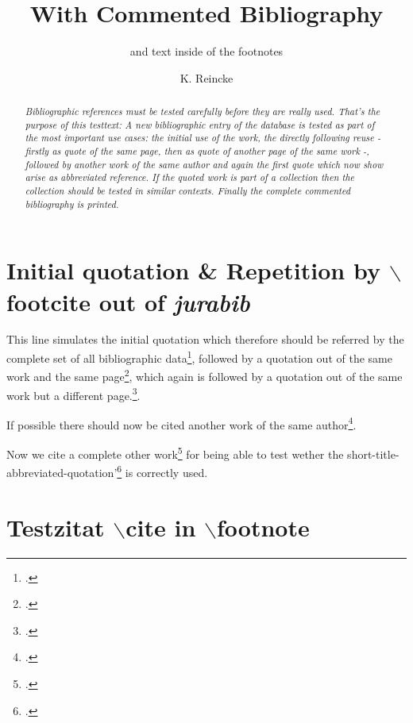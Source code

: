 \documentclass[DIV=calc,BCOR=5mm,11pt,headings=small,oneside,abstract=true, toc=bib]{scrartcl}
\begin{document}
\nocite{*}

\titlehead{bibliography test}
\subject{For testing \itshape{new bibliographisc data}}
\title{With Commented Bibliography}
\subtitle{and text inside of the footnotes}
\author{K. Reincke}
\maketitle

\begin{abstract}
\noindent \itshape
Bibliographic references must be tested carefully before they are really used.
That's the purpose of this testtext: A new bibliographic entry of the database
is tested as part of the most important use cases: the initial use of the work,
the directly following reuse - firstly as quote of the same page, then as quote
of another page of the same work -, followed by another work of the same author
and again the first quote which now show arise as abbreviated reference. If the
quoted work is part of a collection then the collection should be tested in
similar contexts. Finally the complete commented bibliography is printed.
\end{abstract}

\section{Initial quotation \& Repetition by $\backslash$footcite out of
\emph{jurabib}}

This line simulates the \glqq initial quotation which therefore should be
referred by the complete set of all bibliographic data\grqq\footcite[cf.
besides:][S.123ff]{Maass2008a}, followed by a \glqq quotation out of the same work
and the same page\grqq\footcite[cf.][S.123ff]{Maass2008a}, which again is
followed by a \glqq  quotation out of the same work but a different
page.\grqq\footcite[cf.][S.125f]{Maass2008a}.

If possible there should now be cited another work of the same
author\footcite[cf.][S.321]{Maass2008a}.

Now we cite a complete other work\footcite[cf.
additionally][S.42]{Spielkamp2008a} for being able to test wether the \glqq
short-title-abbreviated-quotation'\grqq\footcite[cf.
furthermode][S.123]{Maass2008a} is correctly used.

\section{Testzitat $\backslash$cite in $\backslash$footnote}
\end{document}
